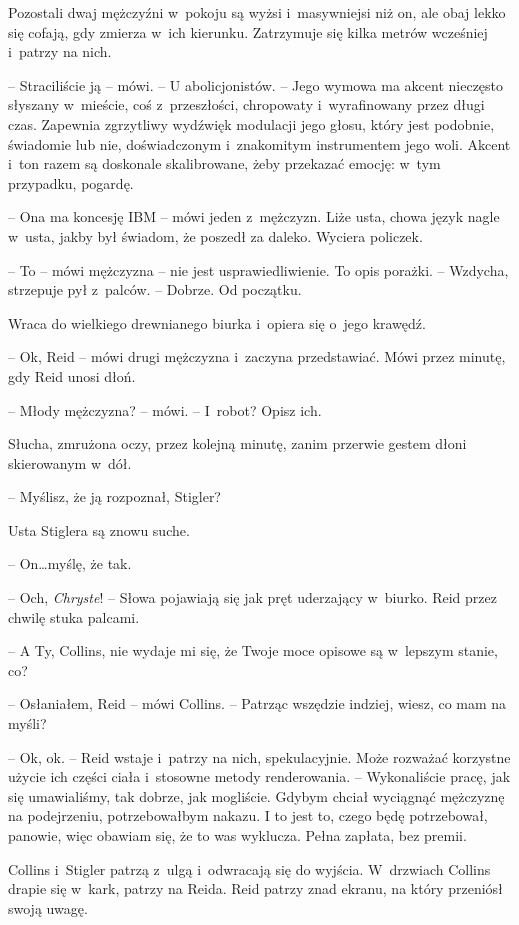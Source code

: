 \documentclass[oneside,polish,11pt,sfheadings]{mwbk}
\begin{document}
Pozostali dwaj mężczyźni w~pokoju są wyżsi i~masywniejsi niż on, ale
obaj lekko się cofają, gdy zmierza w~ich kierunku. Zatrzymuje się kilka
metrów wcześniej i~patrzy na nich.

-- Straciliście ją -- mówi. -- U abolicjonistów. -- Jego wymowa ma akcent
nieczęsto słyszany w~mieście, coś z~przeszłości, chropowaty i~wyrafinowany przez długi czas. Zapewnia zgrzytliwy wydźwięk modulacji
jego głosu, który jest podobnie, świadomie lub nie, doświadczonym i~znakomitym instrumentem jego woli. Akcent i~ton razem są doskonale
skalibrowane, żeby przekazać emocję: w~tym przypadku, pogardę.

-- Ona ma koncesję IBM -- mówi jeden z~mężczyzn. Liże usta, chowa język
nagle w~usta, jakby był świadom, że poszedł za daleko. Wyciera policzek.

-- To -- mówi mężczyzna -- nie jest usprawiedliwienie. To opis porażki. -- Wzdycha, strzepuje pył z~palców. -- Dobrze. Od początku.

Wraca do wielkiego drewnianego biurka i~opiera się o~jego krawędź.

-- Ok, Reid -- mówi drugi mężczyzna i~zaczyna przedstawiać. Mówi przez
minutę, gdy Reid unosi dłoń.

-- Młody mężczyzna? -- mówi. -- I~robot? Opisz ich.

Słucha, zmrużona oczy, przez kolejną minutę, zanim przerwie gestem dłoni
skierowanym w~dół.

-- Myślisz, że ją rozpoznał, Stigler?

Usta Stiglera są znowu suche.

-- On\ldots myślę, że tak.

-- Och, \emph{Chryste}! -- Słowa pojawiają się jak pręt uderzający w~biurko. Reid przez chwilę stuka palcami.

-- A Ty, Collins, nie wydaje mi się, że Twoje moce opisowe są w~lepszym
stanie, co?

-- Osłaniałem, Reid -- mówi Collins. -- Patrząc wszędzie indziej, wiesz, co
mam na myśli?

-- Ok, ok. -- Reid wstaje i~patrzy na nich, spekulacyjnie. Może rozważać
korzystne użycie ich części ciała i~stosowne metody renderowania. -- Wykonaliście pracę, jak się umawialiśmy, tak dobrze, jak mogliście.
Gdybym chciał wyciągnąć mężczyznę na podejrzeniu, potrzebowałbym nakazu.
I to jest to, czego będę potrzebował, panowie, więc obawiam się, że to
was wyklucza. Pełna zapłata, bez premii.

Collins i~Stigler patrzą z~ulgą i~odwracają się do wyjścia. W~drzwiach
Collins drapie się w~kark, patrzy na Reida. Reid patrzy znad ekranu, na
który przeniósł swoją uwagę.
\end{document}
